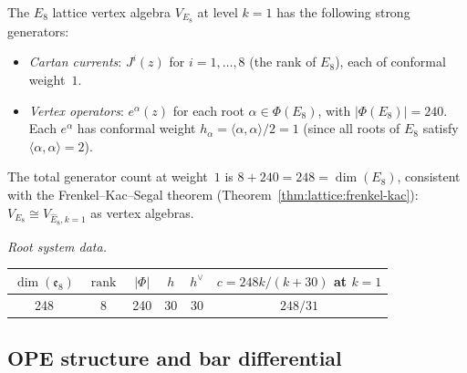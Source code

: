 \begin{computation}
\label{comp:E8-generators}
The $E_8$ lattice vertex algebra $V_{E_8}$ at level $k = 1$ has the
following strong generators:
\begin{itemize}
\item \emph{Cartan currents}: $J^i(z)$ for $i = 1, \ldots, 8$
  (the rank of $E_8$), each of conformal weight~$1$.
\item \emph{Vertex operators}: $e^\alpha(z)$ for each root
  $\alpha \in \Phi(E_8)$, with $|\Phi(E_8)| = 240$.
  Each $e^\alpha$ has conformal weight
  $h_\alpha = \langle \alpha, \alpha \rangle / 2 = 1$
  (since all roots of $E_8$ satisfy $\langle \alpha, \alpha \rangle = 2$).
\end{itemize}
The total generator count at weight~$1$ is
$8 + 240 = 248 = \dim(E_8)$, consistent with the Frenkel--Kac--Segal
theorem (Theorem~\ref{thm:lattice:frenkel-kac}):
$V_{E_8} \cong V_{\widehat{E}_8, k=1}$ as vertex algebras.

\emph{Root system data.}
\begin{center}
\renewcommand{\arraystretch}{1.15}
\begin{tabular}{cccccc}
$\dim(\mathfrak{e}_8)$ & $\operatorname{rank}$ & $|\Phi|$ & $h$
  & $h^\vee$ & $c = 248k/(k+30)$ at $k=1$ \\
\hline
248 & 8 & 240 & 30 & 30 & $248/31$
\end{tabular}
\end{center}
\end{computation}

\subsection{OPE structure and bar differential}

